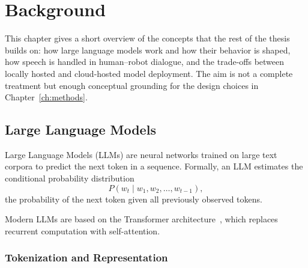\chapter{Background}
\label{ch:background}



This chapter gives a short overview of the concepts that the rest of the thesis builds on: how large language models work and how their behavior is shaped, how speech is handled in human--robot dialogue, and the trade-offs between locally hosted and cloud-hosted model deployment.
The aim is not a complete treatment but enough conceptual grounding for the design choices in Chapter~\ref{ch:methods}.


\section{Large Language Models}
\label{sec:llm_foundations}

Large Language Models (LLMs) are neural networks trained on large text corpora to predict the next token in a sequence.
Formally, an LLM estimates the conditional probability distribution
\[
P(w_t \mid w_1, w_2, \dots, w_{t-1}),
\]
the probability of the next token given all previously observed tokens.

Modern LLMs are based on the Transformer architecture~\cite{vaswani2017attention}, which replaces recurrent computation with self-attention.

\subsection{Tokenization and Representation}

